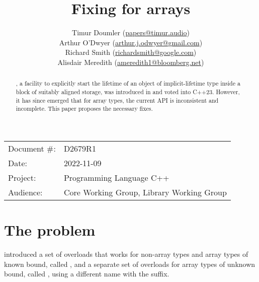 
\usepackage{listings}

\newcommand{\forceindent}{\parindent=1em\indent\parindent=0pt\relax} %


\title{Fixing  for arrays}
\author{
  Timur Doumler \small(\href{mailto:papers@timur.audio}{papers@timur.audio}) \\
  Arthur O'Dwyer \small(\href{mailto:arthur.j.odwyer@gmail.com}{arthur.j.odwyer@gmail.com}) \\
  Richard Smith \small(\href{mailto:richardsmith@google.com}{richardsmith@google.com}) \\
  Alisdair Meredith \small(\href{mailto:ameredith1@bloomberg.net}{ameredith1@bloomberg.net})
}
\date{}
\maketitle

\begin{tabular}{ll}
Document \#: & D2679R1 \\
Date: & 2022-11-09\\
Project: & Programming Language C++ \\
Audience: & Core Working Group, Library Working Group
\end{tabular}


\begin{abstract}
, a facility to explicitly start the lifetime of an object of implicit-lifetime type inside a block of suitably aligned storage, was introduced in \cite{P2590R2} and voted into C++23. However, it has since emerged that for array types, the current API is inconsistent and incomplete. This paper proposes the necessary fixes.
\end{abstract}

\section{The problem}
\label{sec:problem}

\cite{P2590R2} introduced a set of overloads that works for non-array types and array types of known bound, called , and a separate set of overloads for array types of unknown bound, called  , using a different name with the  suffix.


